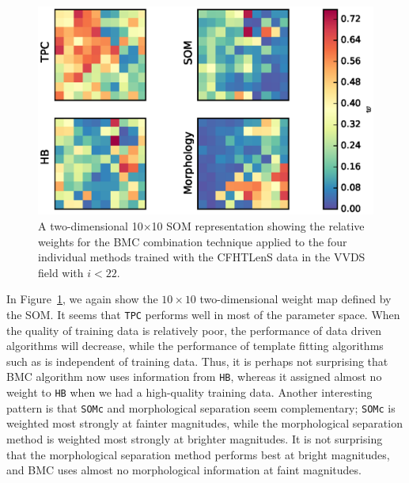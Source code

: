 \documentclass[useAMS,usenatbib]{mn2e}
\begin{document}
\begin{figure}
  \centering
  \includegraphics[width=\linewidth]{figures/weights_cut.eps}
  \caption{A two-dimensional 10$\times$10 SOM representation
           showing the relative weights for the BMC combination technique
           applied to the four individual methods
           trained with the CFHTLenS data in the VVDS field
           with $i < 22$.}
  \label{fig:weights_cut}
\end{figure}

In Figure~\ref{fig:weights_cut}, we again show the $10\times10$
two-dimensional weight map defined by the SOM.
It seems that \texttt{TPC} performs well
in most of the parameter space.
When the quality of training data is relatively poor,
the performance of data driven algorithms will decrease,
while the performance of template fitting algorithms such as 
is independent of training data.
Thus, it is perhaps not surprising that
BMC algorithm now uses information from \texttt{HB},
whereas it assigned almost no weight to \texttt{HB}
when we had a high-quality training data.
Another interesting pattern is that
\texttt{SOMc} and morphological separation seem complementary;
\texttt{SOMc} is weighted most strongly at fainter magnitudes,
while the morphological separation method
is weighted most strongly at brighter magnitudes.
It is not surprising that the morphological separation method
performs best at bright magnitudes,
and BMC uses almost no morphological information at faint magnitudes.
\end{document}
